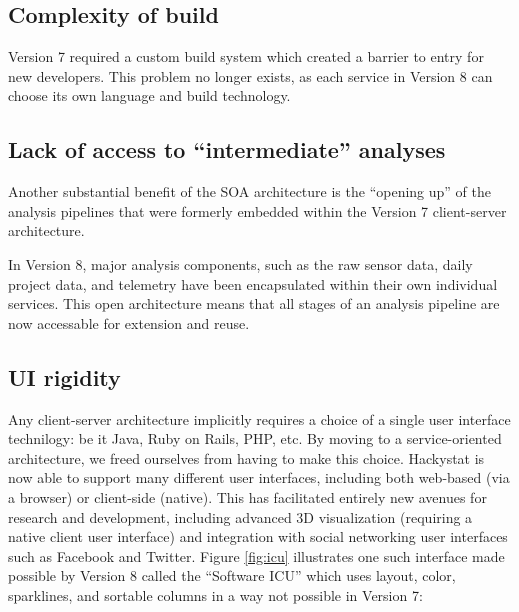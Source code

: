 \documentclass[conference,compsoc]{IEEEtran}
\begin{document}





\subsection{Complexity of build}

Version 7 required a custom build system which created a barrier to entry
for new developers.  This problem no longer exists, as each service in
Version 8 can choose its own language and build technology.

\subsection{Lack of access to ``intermediate'' analyses}

Another substantial benefit of the SOA architecture is the ``opening up''
of the analysis pipelines that were formerly embedded within the Version 7
client-server architecture.

In Version 8, major analysis components, such as the raw sensor data, daily
project data, and telemetry have been encapsulated within their own
individual services.  This open architecture means that all stages of an
analysis pipeline are now accessable for extension and reuse. 

\subsection{UI rigidity}

Any client-server architecture implicitly requires a choice of a single
user interface technilogy: be it Java, Ruby on Rails, PHP, etc.  By moving
to a service-oriented architecture, we freed ourselves from having to make
this choice. Hackystat is now able to support many different user
interfaces, including both web-based (via a browser) or client-side
(native).  This has facilitated entirely new avenues for research and
development, including advanced 3D visualization (requiring a native client
user interface) and integration with social networking user interfaces such
as Facebook and Twitter.  Figure \ref{fig:icu} illustrates one such 
interface made possible by Version 8 called the ``Software ICU'' which uses 
layout, color, sparklines, and sortable columns in a way not possible in Version 7:
\end{document}

